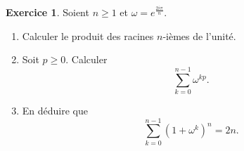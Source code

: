 \documentclass[a4paper, 11pt,openany]{article}%
\theoremstyle{plain}
\theoremstyle{definition}
\newtheorem{exo}{Exercice}
\newtheorem{sol}{Solution de l'exercice}
\theoremstyle{remark}
\begin{document}
\begin{exo}
Soient $n \geqslant 1$ et $\omega = e^{\frac{2i \pi}{n}}$.
\begin{enumerate}
\item Calculer le produit des racines $n$-ièmes de l'unité.
\item Soit $p \geqslant 0$. Calculer
\[ \sum_{k=0}^{n-1} \omega^{kp}.\]
\item En déduire que 
\[ \sum_{k=0}^{n-1} (1 + \omega^k)^n = 2n.\]
\end{enumerate}
\end{exo}

\end{document}
